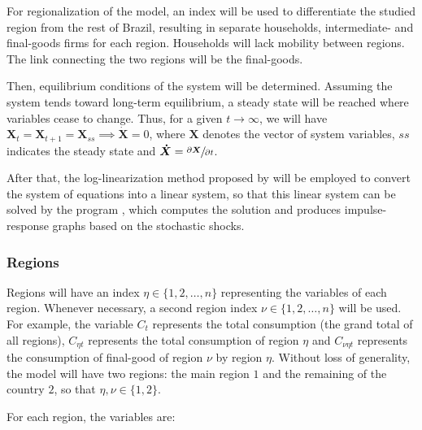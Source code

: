 \documentclass[
thesis.tex
]{subfiles}
\begin{document}
	For regionalization of the model, an index will be used to differentiate the studied region from the rest of Brazil, resulting in separate households, intermediate- and final-goods firms for each region. Households will lack mobility between regions. The link connecting the two regions will be the final-goods.
	
	Then, equilibrium conditions of the system will be determined. Assuming the system tends toward long-term equilibrium, a steady state will be reached where variables cease to change. Thus, for a given $t \longrightarrow \infty$, we will have $\boldsymbol{X}_t = \boldsymbol{X}_{t+1} = \boldsymbol{X}_{ss} \implies \boldsymbol{\dot{X}} = 0$, where $\boldsymbol{X}$ denotes the vector of system variables, $ss$ indicates the steady state and $\boldsymbol{\dot{X}} = \sfrac{\partial \boldsymbol{X}}{\partial t}$. 
	
	After that, the log-linearization method proposed by \textcite{uhlig_toolkit_1999} will be employed to convert the system of equations into a linear system, so that this linear system can be solved by the program \dynare{}, which computes the solution and produces impulse-response graphs based on the stochastic shocks.

	
\subsubsection*{Regions}\label{sec:regions}

	
	
	Regions will have an index $\eta \in \{1,2,\ldots,n\}$ representing the variables of each region. Whenever necessary, a second region index $\nu \in \{1,2,\ldots,n\}$ will be used. For example, the variable $C_{t}$ represents the total consumption (the grand total of all regions), $C_{\eta t}$ represents the total consumption of region $\eta$ and $C_{\nu \eta t}$ represents the consumption of final-good of region $\nu$ by region $\eta$. Without loss of generality, the model will have two regions: the main region $1$ and the remaining of the country $2$, so that $\eta,\nu \in \{1,2\}$.

	For each region, the variables are:
\end{document}

